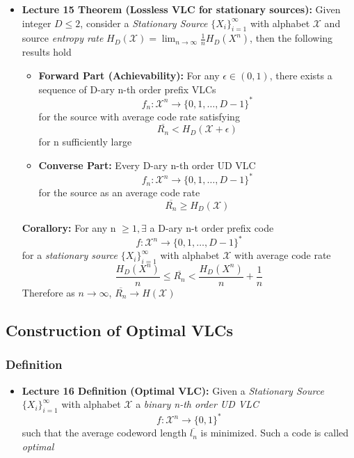 \documentclass{article}
\begin{document}
\begin{itemize}
    \item \textbf{Lecture 15 Theorem (Lossless VLC for stationary sources): } Given integer \(D \leq 2\), consider a \textit{Stationary Source} \(\{X_i\}^\infty_{i=1}\) with alphabet \(\mathcal{X}\)
    and source \textit{entropy rate} \(H_D(\mathcal{X}) = \lim_{n\to\infty} \frac{1}{n} H_D(X^n)\), then the following results hold
    \begin{itemize}
        \item \textbf{Forward Part (Achievability):} For any \(\epsilon \in (0,1)\), there exists a sequence of D-ary n-th order prefix VLCs
        \[f_n: \mathcal{X}^n \to \{0,1,\ldots, D-1\}^*\]
        for the source with average code rate satisfying 
        \[\overline{R_n} < H_D(\mathcal{X} + \epsilon)\]
        for n sufficiently large

        \item \textbf{Converse Part:} Every D-ary n-th order UD VLC
        \[ f_n: \mathcal{X}^n \to \{0,1,\ldots, D-1\}^*\]
        for the source as an average code rate
        \[\overline{R_n} \geq H_D(\mathcal{X})\]
    \end{itemize}
    \textbf{Corallory:} For any n \(\geq 1, \exists\)  a D-ary n-t order prefix code
    \[f: \mathcal{X}^n \to \{0,1,\ldots, D-1\}^*\]
    for a \textit{stationary source} \(\{X_i\}^\infty_{i=1}\) with alphabet \(\mathcal{X}\) with average code rate
    \[\frac{H_D(X^n)}{n} \leq \overline{R_n} < \frac{H_D(X^n)}{n} + \frac{1}{n}\]
    Therefore as \(n \to \infty\), \(\overline{R_n} \to H(\mathcal{X})\)
\end{itemize}

\subsection{Construction of Optimal VLCs}
\subsubsection{Definition}
\begin{itemize}
    \item \textbf{Lecture 16 Definition (Optimal VLC):} Given a \textit{Stationary Source} \(\{X_i\}^\infty_{i=1}\) with alphabet \(\mathcal{X}\) 
    a \textit{binary n-th order UD VLC}
    \[f: \mathcal{X}^n \to \{0,1\}^*\]
    such that the average codeword length \(\overline{l_n}\) is minimized. Such a code is called \textit{optimal}
\end{itemize}
\end{document}
